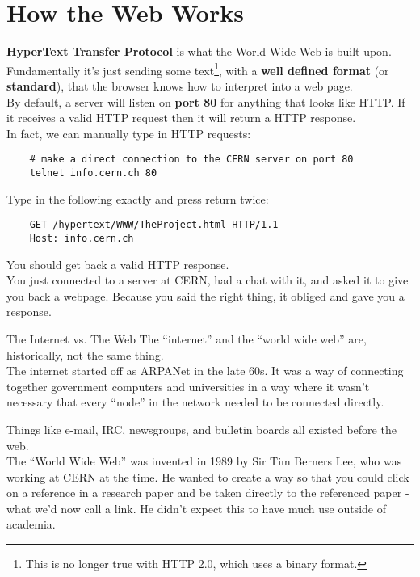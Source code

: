 \section{How the Web Works}

\textbf{HyperText Transfer Protocol} is what the World Wide Web is built upon.
\\

Fundamentally it's just sending some text\footnote{This is no longer true with HTTP 2.0, which uses a binary format.}, with a \textbf{well defined format} (or \textbf{standard}), that the browser knows how to interpret into a web page.
\\

By default, a server will listen on \textbf{port 80} for anything that looks like HTTP. If it receives a valid HTTP request then it will return a HTTP response.
\\

In fact, we can manually type in HTTP requests:

\begin{verbatim}
    # make a direct connection to the CERN server on port 80
    telnet info.cern.ch 80
\end{verbatim}

Type in the following exactly and press return twice:

\begin{verbatim}
    GET /hypertext/WWW/TheProject.html HTTP/1.1
    Host: info.cern.ch
\end{verbatim}

You should get back a valid HTTP response.
\\

You just connected to a server at CERN, had a chat with it, and asked it to give you back a webpage. Because you said the right thing, it obliged and gave you a response.

\begin{infobox}{The Internet vs. The Web}
    The ``internet'' and the ``world wide web'' are, historically, not the same thing.
    \\

    The internet started off as ARPANet in the late 60s. It was a way of connecting together government computers and universities in a way where it wasn't necessary that every ``node'' in the network needed to be connected directly.
    \\


    Things like e-mail, IRC, newsgroups, and bulletin boards all existed before the web.
    \\

    The ``World Wide Web'' was invented in 1989 by Sir Tim Berners Lee, who was working at CERN at the time. He wanted to create a way so that you could click on a reference in a research paper and be taken directly to the referenced paper - what we'd now call a link. He didn't expect this to have much use outside of academia.
\end{infobox}


